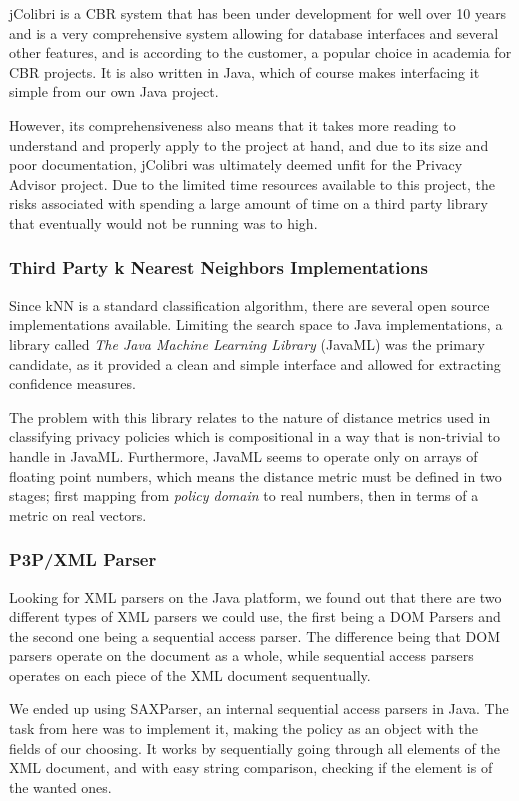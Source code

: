 jColibri is a CBR system that has been under development for well over 10 years and is a very comprehensive system allowing for database interfaces and several other features,  and is according to the customer, a popular choice in academia for CBR projects. It is also written in Java, which of course makes interfacing it simple from our own Java project.
 
However, its comprehensiveness also means that it takes more reading to understand and properly apply to the project at hand, and due to its size and poor documentation, jColibri was ultimately deemed unfit for the Privacy Advisor project. Due to the limited time resources available to this project, the risks associated with spending a large amount of time on a third party library that eventually would not be running was to high.
 
\subsubsection{Third Party k Nearest Neighbors Implementations}
Since kNN is a standard classification algorithm, there are several open source implementations available. Limiting the search space to Java implementations, a library called \emph{The Java Machine Learning Library} (JavaML) was the primary candidate, as it provided a clean and simple interface and allowed for extracting confidence measures.
 
The problem with this library relates to the nature of distance metrics used in classifying privacy policies which is compositional in a way that is non-trivial to handle in JavaML. Furthermore, JavaML seems to operate only on arrays of floating point numbers, which means the distance metric must be defined in two stages; first mapping from \emph{policy domain} to real numbers, then in terms of a metric on real vectors.

\subsubsection{P3P/XML Parser}
Looking for XML parsers on the Java platform, we found out that there are two different types of XML parsers we could use, the first being a DOM Parsers and the second one being a sequential access parser. The difference being that DOM parsers operate on the document as a whole, while sequential access parsers operates on each piece of the XML document sequentually.

We ended up using SAXParser, an internal sequential access parsers in Java. The task from here was to implement it, making the policy as an object with the fields of our choosing. It works by sequentially going through all elements of the XML document, and with easy string comparison, checking if the element is of the wanted ones.



